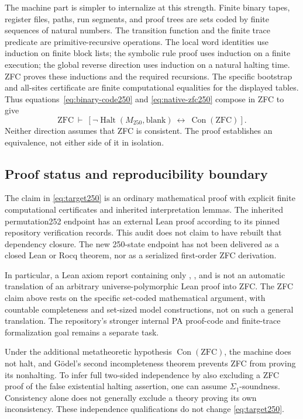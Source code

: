 The machine part is simpler to internalize at this strength.
Finite binary tapes, register files, paths, run segments, and
proof trees are sets coded by finite sequences of natural
numbers.  The transition function and the finite trace
predicate are primitive-recursive operations.  The local
word identities use induction on finite block lists; the
symbolic rule proof uses induction on a finite execution;
the global reverse direction uses induction on a natural
halting time.  ZFC proves these inductions and the required
recursions.  The specific bootstrap and all-sites certificate
are finite computational equalities for the displayed
tables.  Thus equations~\eqref{eq:binary-code250} and
\eqref{eq:native-zfc250} compose in ZFC to give
\[
 \boxed{\quad
 \mathrm{ZFC}\ \vdash\
 \left[\neg\operatorname{Halt}(M_{250},\mathrm{blank})
 \ \longleftrightarrow\ \operatorname{Con}(\mathrm{ZFC})\right].
 \quad}
\tag{8}\label{eq:target250}
\]
Neither direction assumes that ZFC is consistent.  The proof
establishes an equivalence, not either side of it in isolation.

\subsection{Proof status and reproducibility boundary}

The claim in \eqref{eq:target250} is an ordinary mathematical
proof with explicit finite computational certificates and
inherited interpretation lemmas.  The inherited permutation252
endpoint has an external Lean proof according to its pinned
repository verification records.  This audit does not claim
to have rebuilt that dependency closure.  The new 250-state
endpoint has not been delivered as a closed Lean or Rocq
theorem, nor as a serialized first-order ZFC derivation.

In particular, a Lean axiom report containing only
, , and
 is not an automatic translation of an
arbitrary universe-polymorphic Lean proof into ZFC.  The
ZFC claim above rests on the specific set-coded mathematical
argument, with countable completeness and set-sized model
constructions, not on such a general translation.  The
repository's stronger internal PA proof-code and finite-trace
formalization goal remains a separate task.

Under the additional metatheoretic hypothesis
$\operatorname{Con}(\mathrm{ZFC})$, the machine does not
halt, and G\"odel's second incompleteness theorem prevents
ZFC from proving its nonhalting.  To infer full two-sided
independence by also excluding a ZFC proof of the false
existential halting assertion, one can assume
$\Sigma_1$-soundness.  Consistency alone does not generally
exclude a theory proving its own inconsistency.  These
independence qualifications do not change
\eqref{eq:target250}.


